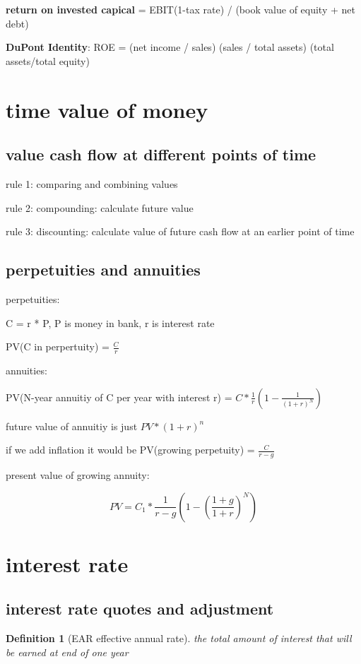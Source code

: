 \documentclass[10pt]{article}
\theoremstyle{break}
\newtheorem{defn}{Definition}[subsection]
\begin{document}
\textbf{return on invested capical} = EBIT(1-tax rate) / (book value of equity + net debt)

\textbf{DuPont Identity}: ROE = (net income / sales) (sales / total assets) (total assets/total equity)

\section{time value of money}
\subsection{value cash flow at different points of time}
rule 1: comparing and combining values 

rule 2: compounding: calculate future value

rule 3: discounting: calculate value of future cash flow at an earlier point of time


\subsection{perpetuities and annuities}
perpetuities:

C = r * P, P is money in bank, r is interest rate 

PV(C in perpertuity) = $\frac{C}{r}$

annuities: 

PV(N-year annuitiy of C per year with interest r) = $C*\frac{1}{r}\left(1-\frac{1}{(1+r)^N}\right)$

future value of annuitiy is just $PV * (1+r)^n$

if we add inflation it would be PV(growing perpetuity) = $\frac{C}{r-g}$

present value of growing annuity:

$$PV=C_1 * \frac{1}{r-g}\left(1-(\frac{1+g}{1+r})^N\right)$$

\section{interest rate}
\subsection{interest rate quotes and adjustment}
\begin{defn}[EAR effective annual rate]
    the total amount of interest that will be earned at end of one year 
\end{defn}
\end{document}
